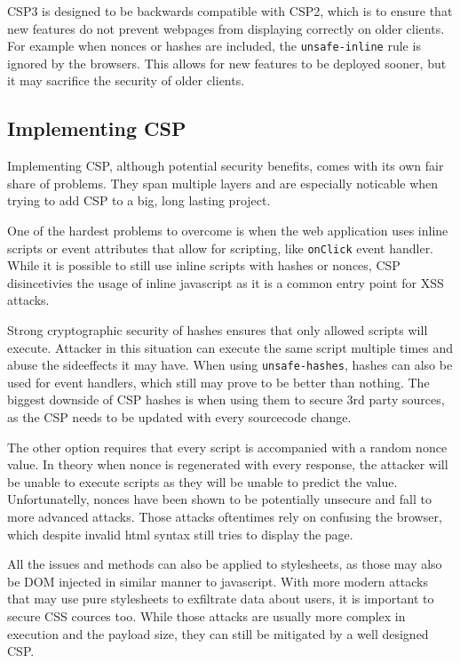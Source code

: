 \documentclass[11]{article}   %
\begin{document}
CSP3 is designed to be backwards compatible with CSP2, which is to ensure that new features do not prevent webpages from displaying correctly on older clients.
For example when nonces or hashes are included, the \texttt{unsafe-inline} rule is ignored by the browsers.
This allows for new features to be deployed sooner, but it may sacrifice the security of older clients.


\subsection{Implementing CSP}
Implementing CSP, although potential security benefits, comes with its own fair share of problems. 
They span multiple layers and are especially noticable when trying to add CSP to a big, long lasting project.

One of the hardest problems to overcome is when the web application uses inline scripts or event attributes that allow for scripting, like \texttt{onClick} event handler.
While it is possible to still use inline scripts with hashes or nonces, CSP disincetivies the usage of inline javascript as it is a common entry point for XSS attacks. 

Strong cryptographic security of hashes ensures that only allowed scripts will execute. 
Attacker in this situation can execute the same script multiple times and abuse the sideeffects it may have.
When using \texttt{unsafe-hashes}, hashes can also be used for event handlers, which still may prove to be better than nothing.
The biggest downside of CSP hashes is when using them to secure 3rd party sources, as the CSP needs to be updated with every sourcecode change.

The other option requires that every script is accompanied with a random nonce value.
In theory when nonce is regenerated with every response, the attacker will be unable to execute scripts as they will be unable to predict the value.
Unfortunatelly, nonces have been shown to be potentially unsecure and fall to more advanced attacks. \cite{noncesGoBrrr}
Those attacks oftentimes rely on confusing the browser, which despite invalid html syntax still tries to display the page.

All the issues and methods can also be applied to stylesheets, as those may also be DOM injected in similar manner to javascript. \cite{cssinjection} \cite{cssexfil}
With more modern attacks that may use pure stylesheets to exfiltrate data about users, it is important to secure CSS cources too.
While those attacks are usually more complex in execution and the payload size, they can still be mitigated by a well designed CSP.
\end{document}
